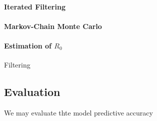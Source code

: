 \paragraph{Iterated Filtering}




\paragraph{Markov-Chain Monte Carlo}



\paragraph{Estimation of $R_0$} 

 Filtering
\subsection{Evaluation}
We may evaluate thte model predictive accuracy
